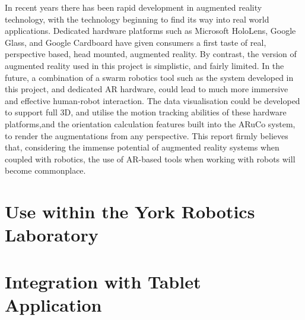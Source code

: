In recent years there has been rapid development in augmented reality technology, with the technology beginning to find its way into real world applications. Dedicated hardware platforms such as Microsoft HoloLens, Google Glass, and Google Cardboard have given consumers a first taste of real, perspective based, head mounted, augmented reality. By contrast, the version of augmented reality used in this project is simplistic, and fairly limited. In the future, a combination of a swarm robotics tool such as the system developed in this project, and dedicated AR hardware, could lead to much more immersive and effective human-robot interaction. The data visualisation could be developed to support full 3D, and utilise the motion tracking abilities of these hardware platforms,and the orientation calculation features built into the ARuCo system, to render the augmentations from any perspective. This report firmly believes that, considering the immense potential of augmented reality systems when coupled with robotics, the use of AR-based tools when working with robots will become commonplace.


\section{Use within the York Robotics Laboratory}



\section{Integration with Tablet Application}


